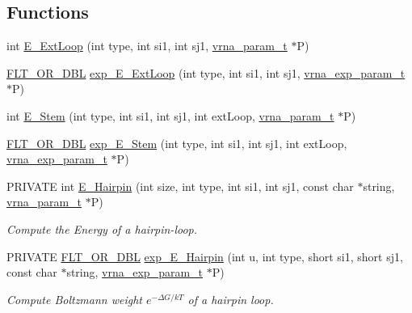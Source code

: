 \subsection*{Functions}
\begin{DoxyCompactItemize}
\item 
int \hyperlink{group__loops_ga05c6288c5a79d3bd5ad6d33c1bb34bd0}{E\+\_\+\+Ext\+Loop} (int type, int si1, int sj1, \hyperlink{group__energy__parameters_ga8a69ca7d787e4fd6079914f5343a1f35}{vrna\+\_\+param\+\_\+t} $\ast$P)
\item 
\hyperlink{group__data__structures_ga31125aeace516926bf7f251f759b6126}{F\+L\+T\+\_\+\+O\+R\+\_\+\+D\+BL} \hyperlink{group__loops_ga446828a191c127861e76e2c84055f672}{exp\+\_\+\+E\+\_\+\+Ext\+Loop} (int type, int si1, int sj1, \hyperlink{group__energy__parameters_ga01d8b92fe734df8d79a6169482c7d8d8}{vrna\+\_\+exp\+\_\+param\+\_\+t} $\ast$P)
\item 
int \hyperlink{group__loops_ga51f9851f3500c2aae66674142a6a2dd5}{E\+\_\+\+Stem} (int type, int si1, int sj1, int ext\+Loop, \hyperlink{group__energy__parameters_ga8a69ca7d787e4fd6079914f5343a1f35}{vrna\+\_\+param\+\_\+t} $\ast$P)
\item 
\hyperlink{group__data__structures_ga31125aeace516926bf7f251f759b6126}{F\+L\+T\+\_\+\+O\+R\+\_\+\+D\+BL} \hyperlink{group__loops_gab0aa9833ab41875a91a9be8a5ffd7092}{exp\+\_\+\+E\+\_\+\+Stem} (int type, int si1, int sj1, int ext\+Loop, \hyperlink{group__energy__parameters_ga01d8b92fe734df8d79a6169482c7d8d8}{vrna\+\_\+exp\+\_\+param\+\_\+t} $\ast$P)
\item 
P\+R\+I\+V\+A\+TE int \hyperlink{group__loops_gadf943ee9a45b7f4cee9192c06210dace}{E\+\_\+\+Hairpin} (int size, int type, int si1, int sj1, const char $\ast$string, \hyperlink{group__energy__parameters_ga8a69ca7d787e4fd6079914f5343a1f35}{vrna\+\_\+param\+\_\+t} $\ast$P)
\begin{DoxyCompactList}\small\item\em Compute the Energy of a hairpin-\/loop. \end{DoxyCompactList}\item 
P\+R\+I\+V\+A\+TE \hyperlink{group__data__structures_ga31125aeace516926bf7f251f759b6126}{F\+L\+T\+\_\+\+O\+R\+\_\+\+D\+BL} \hyperlink{group__loops_ga51fb555974f180b78d76142b2894851c}{exp\+\_\+\+E\+\_\+\+Hairpin} (int u, int type, short si1, short sj1, const char $\ast$string, \hyperlink{group__energy__parameters_ga01d8b92fe734df8d79a6169482c7d8d8}{vrna\+\_\+exp\+\_\+param\+\_\+t} $\ast$P)
\begin{DoxyCompactList}\small\item\em Compute Boltzmann weight $e^{-\Delta G/kT} $ of a hairpin loop. \end{DoxyCompactList}\item 

\end{DoxyCompactItemize}
